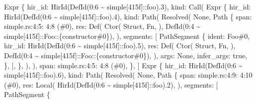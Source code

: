 \documentclass[
  11pt,
  twoside]{report}
\newenvironment{Shaded}{}{}
\newcommand{\NormalTok}[1]{#1}
\begin{document}
\begin{Shaded}
\begin{Highlighting}[]
\NormalTok{Expr \{}
\NormalTok{    hir\_id: HirId(DefId(0:6 \textasciitilde{} simple[415f]::foo).3),}
\NormalTok{    kind: Call(}
\NormalTok{        Expr \{}
\NormalTok{            hir\_id: HirId(DefId(0:6 \textasciitilde{} simple[415f]::foo).4),}
\NormalTok{            kind: Path(}
\NormalTok{                Resolved(}
\NormalTok{                    None,}
\NormalTok{                    Path \{}
\NormalTok{                        span: simple.rs:4:5: 4:8 (\#0),}
\NormalTok{                        res: Def(}
\NormalTok{                            Ctor(}
\NormalTok{                                Struct,}
\NormalTok{                                Fn,}
\NormalTok{                            ),}
\NormalTok{                            DefId(0:4 \textasciitilde{} simple[415f]::Foo::\{constructor\#0\}),}
\NormalTok{                        ),}
\NormalTok{                        segments: [}
\NormalTok{                            PathSegment \{}
\NormalTok{                                ident: Foo\#0,}
\NormalTok{                                hir\_id: HirId(DefId(0:6 \textasciitilde{} simple[415f]::foo).5),}
\NormalTok{                                res: Def(}
\NormalTok{                                    Ctor(}
\NormalTok{                                        Struct,}
\NormalTok{                                        Fn,}
\NormalTok{                                    ),}
\NormalTok{                                    DefId(0:4 \textasciitilde{} simple[415f]::Foo::\{constructor\#0\}),}
\NormalTok{                                ),}
\NormalTok{                                args: None,}
\NormalTok{                                infer\_args: true,}
\NormalTok{                            \},}
\NormalTok{                        ],}
\NormalTok{                    \},}
\NormalTok{                ),}
\NormalTok{            ),}
\NormalTok{            span: simple.rs:4:5: 4:8 (\#0),}
\NormalTok{        \},}
\NormalTok{        [}
\NormalTok{            Expr \{}
\NormalTok{                hir\_id: HirId(DefId(0:6 \textasciitilde{} simple[415f]::foo).6),}
\NormalTok{                kind: Path(}
\NormalTok{                    Resolved(}
\NormalTok{                        None,}
\NormalTok{                        Path \{}
\NormalTok{                            span: simple.rs:4:9: 4:10 (\#0),}
\NormalTok{                            res: Local(}
\NormalTok{                                HirId(DefId(0:6 \textasciitilde{} simple[415f]::foo).2),}
\NormalTok{                            ),}
\NormalTok{                            segments: [}
\NormalTok{                                PathSegment \{}

\end{Highlighting}
\end{Shaded}
\end{document}
